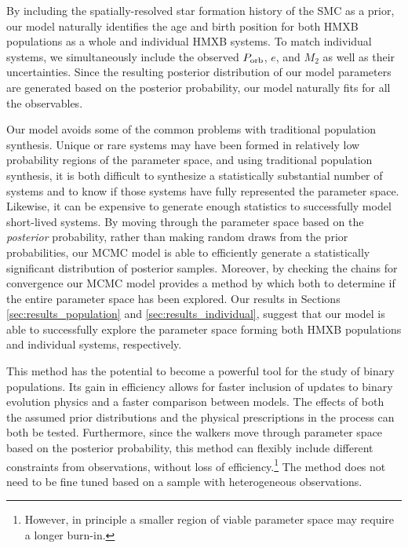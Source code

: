 \documentclass[usenatbib]{mnras}
\begin{document}
By including the spatially-resolved star formation history of the SMC as a prior, our model naturally identifies the age and birth position for both HMXB populations as a whole and individual HMXB systems. To match individual systems, we simultaneously include the observed $P_{\rm orb}$, $e$, and $M_2$ as well as their uncertainties. Since the resulting posterior distribution of our model parameters are generated based on the posterior probability, our model naturally fits for all the observables. 

Our model avoids some of the common problems with traditional population synthesis. Unique or rare systems may have been formed in relatively low probability regions of the parameter space, and using traditional population synthesis, it is both difficult to synthesize a statistically substantial number of systems and to know if those systems have fully represented the parameter space. Likewise, it can be expensive to generate enough statistics to successfully model short-lived systems. By moving through the parameter space based on the {\it posterior} probability, rather than making random draws from the prior probabilities, our MCMC model is able to efficiently generate a statistically significant distribution of posterior samples. Moreover, by checking the chains for convergence our MCMC model provides a method by which both to determine if the entire parameter space has been explored. Our results in Sections \ref{sec:results_population} and \ref{sec:results_individual}, suggest that our model is able to successfully explore the parameter space forming both HMXB populations and individual systems, respectively.

This method has the potential to become a powerful tool for the study of binary populations. Its gain in efficiency allows for faster inclusion of updates to binary evolution physics and a faster comparison between models. The effects of both the assumed prior distributions and the physical prescriptions in the process can both be tested. Furthermore, since the walkers move through parameter space based on the posterior probability, this method can flexibly include different constraints from observations, without loss of efficiency.\footnote{However, in principle a smaller region of viable parameter space may require a longer burn-in.} The method does not need to be fine tuned based on a sample with heterogeneous observations.
\end{document}
